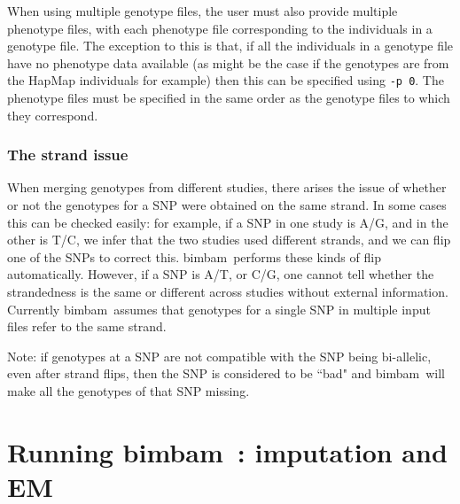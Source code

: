 \documentclass[11pt,Palatino]{article}
\def\bimbam{{\sc bimbam}~}
\begin{document}
When using multiple genotype files, the user must also provide multiple phenotype files, with each phenotype file corresponding to the individuals in a genotype file. The exception to this is that, if all the individuals in a genotype file have no phenotype data available (as might be the case if the genotypes are from the HapMap individuals for example) then this can be specified using {\tt -p 0}. The phenotype
files must be specified in the same order as the genotype files to which they correspond.

\subsubsection{The strand issue}

When merging genotypes from different studies, there arises the issue of whether or not the genotypes for a SNP were obtained on the same strand.
In some cases this can be checked easily: for example, if a SNP in one study is A/G, and in the other is T/C, we infer that  the two studies used
different strands, and we can flip one of the SNPs to correct this. \bimbam performs these kinds of flip automatically.
However, if a SNP is A/T, or C/G, one cannot tell whether the strandedness is the same or different across studies
without external information.  
Currently \bimbam assumes that genotypes  for a single SNP in multiple input files refer to the same strand.

Note: if genotypes at a SNP are not compatible with the SNP being bi-allelic, even after strand flips, then the SNP is considered to be ``bad" and \bimbam will make all the genotypes of that SNP missing.     


\section {Running \bimbam: imputation and EM}
\end{document}
